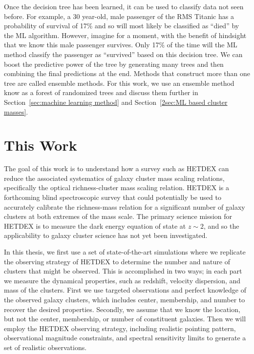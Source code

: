 Once the decision tree has been learned, it can be used to classify data not seen before. For example, a 30 year-old, male passenger of the RMS Titanic has a probability of survival of 17\% and so will most likely be classified as ``died'' by the ML algorithm. However, imagine for a moment, with the benefit of hindsight that we know this male passenger survives. Only 17\% of the time will the ML method classify the passenger as ``survived'' based on this decision tree. We can boost the predictive power of the tree by generating many trees and then combining the final predictions at the end. Methods that construct more than one tree are called ensemble methods. For this work, we use an ensemble method know as a forest of randomized trees and discuss them further in Section~\ref{sec:machine learning method} and Section~\ref{2sec:ML based cluster masses}.

\section{This Work}
The goal of this work is to understand how a survey such as HETDEX can reduce the associated systematics of galaxy cluster mass scaling relations, specifically the optical richness-cluster mass scaling relation. HETDEX is a forthcoming blind spectroscopic survey that could potentially be used to accurately calibrate the richness-mass relation for a significant number of galaxy clusters at both extremes of the mass scale. The primary science mission for HETDEX is to measure the dark energy equation of state at $z\sim2$, and so the applicability to galaxy cluster science has not yet been investigated.

In this thesis, we first use a set of state-of-the-art simulations where we replicate the observing strategy of HETDEX to determine the number and nature of clusters that might be observed. This is accomplished in two ways; in each part we measure the dynamical properties, such as redshift, velocity dispersion, and mass of the clusters. First we use targeted observations and perfect knowledge of the observed galaxy clusters, which includes center, membership, and number to recover the desired properties. Secondly, we assume that we know the location, but not the center, membership, or number of constituent galaxies. Then we will employ the HETDEX observing strategy, including realistic pointing pattern, observational magnitude constraints, and spectral sensitivity limits to generate a set of realistic observations.

